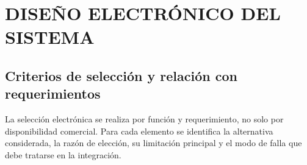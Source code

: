 \documentclass[12pt,a4paper,oneside]{report}
\begin{document}
\chapter{DISEÑO ELECTRÓNICO DEL SISTEMA}\label{capuxedtulo-4-diseuxf1o-electruxf3nico-del-sistema}

\section{Criterios de selección y relación con requerimientos}\label{criterios-electronicos-v2}

La selección electrónica se realiza por función y requerimiento, no solo por disponibilidad comercial. Para cada elemento se identifica la alternativa considerada, la razón de elección, su limitación principal y el modo de falla que debe tratarse en la integración.
\end{document}
